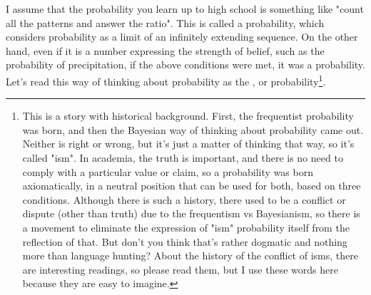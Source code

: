 \documentclass{ltjsarticle}
\begin{document}
I assume that the probability you learn up to high school is something like "count all the patterns and answer the ratio". This is called a  probability, which considers probability as a limit of an infinitely extending sequence. On the other hand, even if it is a number expressing the strength of belief, such as the probability of precipitation, if the above conditions were met, it was a probability. Let's read this way of thinking about probability as the , or  probability\footnote{This is a story with historical background. First, the frequentist probability was born, and then the Bayesian way of thinking about probability came out. Neither is right or wrong, but it's just a matter of thinking that way, so it's called "ism". In academia, the truth is important, and there is no need to comply with a particular value or claim, so a probability was born axiomatically, in a neutral position that can be used for both, based on three conditions. Although there is such a history, there used to be a conflict or dispute (other than truth) due to the frequentism vs Bayesianism, so there is a movement to eliminate the expression of "ism" probability itself from the reflection of that. But don't you think that's rather dogmatic and nothing more than language hunting? About the history of the conflict of isms, there are interesting readings, so please read them\parencite{mcgrayne2011theory}, but I use these words here because they are easy to imagine.}.
\end{document}
